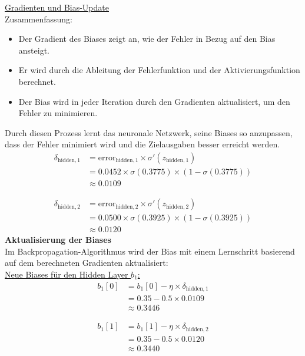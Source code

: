 \documentclass[12pt]{article}
\begin{document}
\underline{Gradienten und Bias-Update}\\

\textmd{Zusammenfassung:}

\begin{itemize}
    \item Der Gradient des Biases zeigt an, wie der Fehler in Bezug auf den Bias ansteigt.
    \item Er wird durch die Ableitung der Fehlerfunktion und der Aktivierungsfunktion berechnet.
    \item Der Bias wird in jeder Iteration durch den Gradienten aktualisiert, um den Fehler zu minimieren.
\end{itemize}
%
Durch diesen Prozess lernt das neuronale Netzwerk, seine Biases so anzupassen, dass der Fehler minimiert wird und die Zielausgaben besser erreicht werden.\\[0.2cm]
\begin{align*}
\delta_{\text{hidden}, 1} &= \text{error}_{\text{hidden}, 1} \times \sigma'(z_{\text{hidden}, 1}) \\
&= 0.0452 \times \sigma(0.3775) \times (1 - \sigma(0.3775)) \\
&\approx 0.0109
\end{align*}

\begin{align*}
\delta_{\text{hidden}, 2} &= \text{error}_{\text{hidden}, 2} \times \sigma'(z_{\text{hidden}, 2}) \\
&= 0.0500 \times \sigma(0.3925) \times (1 - \sigma(0.3925)) \\
&\approx 0.0120
\end{align*}
%
\textbf{Aktualisierung der Biases}\\[0.2cm]
%
Im Backpropagation-Algorithmus  wird der Bias mit einem Lernschritt basierend auf dem berechneten Gradienten aktualisiert:\\[0.2cm]

\underline{Neue Biases für den Hidden Layer \( b_1 \):}
\begin{align*}
b_1[0] &= b_1[0] - \eta \times \delta_{\text{hidden}, 1} \\
&= 0.35 - 0.5 \times 0.0109 \\
& \approx{0.3446}
\end{align*}

\begin{align*}
b_1[1] &= b_1[1] - \eta \times \delta_{\text{hidden}, 2} \\
&= 0.35 - 0.5 \times 0.0120 \\
& \approx{0.3440}
\end{align*}
\end{document}
